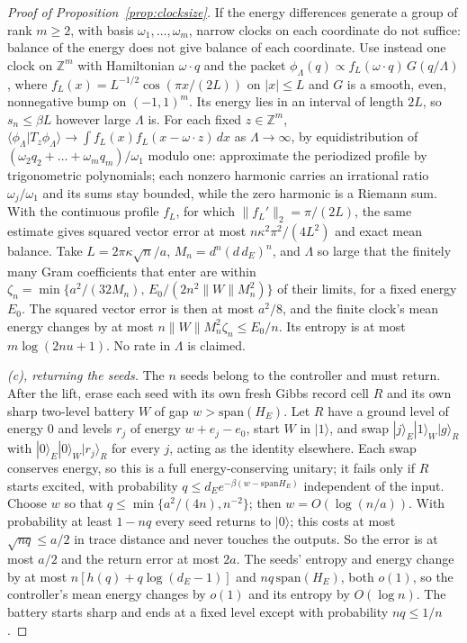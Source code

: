\documentclass[11pt]{article}
\theoremstyle{definition}
\theoremstyle{remark}
\begin{document}
\begin{proof}[Proof of Proposition~\ref{prop:clocksize}]
If the energy differences generate a group of rank $m\ge2$, with basis $\omega_1,\dots,\omega_m$, narrow clocks on each coordinate do not suffice: balance of the energy does not give balance of each coordinate. Use instead one clock on $\mathbb Z^m$ with Hamiltonian $\omega\cdot q$ and the packet $\phi_\Lambda(q)\propto f_L(\omega\cdot q)\,G(q/\Lambda)$, where $f_L(x)=L^{-1/2}\cos(\pi x/(2L))$ on $|x|\le L$ and $G$ is a smooth, even, nonnegative bump on $(-1,1)^m$. Its energy lies in an interval of length $2L$, so $s_n\le\beta L$ however large $\Lambda$ is. For each fixed $z\in\mathbb Z^m$, $\langle\phi_\Lambda|T_z\phi_\Lambda\rangle\to\int f_L(x)f_L(x-\omega\cdot z)\,dx$ as $\Lambda\to\infty$, by equidistribution of $(\omega_2q_2+\dots+\omega_mq_m)/\omega_1$ modulo one: approximate the periodized profile by trigonometric polynomials; each nonzero harmonic carries an irrational ratio $\omega_j/\omega_1$ and its sums stay bounded, while the zero harmonic is a Riemann sum. With the continuous profile $f_L$, for which $\|f_L'\|_2=\pi/(2L)$, the same estimate gives squared vector error at most $n\kappa^2\pi^2/(4L^2)$ and exact mean balance. Take $L=2\pi\kappa\sqrt n/a$, $M_n=d^n(d\,d_E)^n$, and $\Lambda$ so large that the finitely many Gram coefficients that enter are within $\zeta_n=\min\{a^2/(32M_n),\,E_0/(2n^2\|W\|M_n^2)\}$ of their limits, for a fixed energy $E_0$. The squared vector error is then at most $a^2/8$, and the finite clock's mean energy changes by at most $n\|W\|M_n^2\zeta_n\le E_0/n$. Its entropy is at most $m\log(2nu+1)$. No rate in $\Lambda$ is claimed.

\emph{(c), returning the seeds.} The $n$ seeds belong to the controller and must return. After the lift, erase each seed with its own fresh Gibbs record cell $R$ and its own sharp two-level battery $W$ of gap $w>\mathrm{span}(H_E)$. Let $R$ have a ground level of energy $0$ and levels $r_j$ of energy $w+e_j-e_0$, start $W$ in $|1\rangle$, and swap $|j\rangle_E|1\rangle_W|g\rangle_R$ with $|0\rangle_E|0\rangle_W|r_j\rangle_R$ for every $j$, acting as the identity elsewhere. Each swap conserves energy, so this is a full energy-conserving unitary; it fails only if $R$ starts excited, with probability $q\le d_Ee^{-\beta(w-\mathrm{span}H_E)}$ independent of the input. Choose $w$ so that $q\le\min\{a^2/(4n),n^{-2}\}$; then $w=O(\log(n/a))$. With probability at least $1-nq$ every seed returns to $|0\rangle$; this costs at most $\sqrt{nq}\le a/2$ in trace distance and never touches the outputs. So the error is at most $a/2$ and the return error at most $2a$. The seeds' entropy and energy change by at most $n[h(q)+q\log(d_E-1)]$ and $nq\,\mathrm{span}(H_E)$, both $o(1)$, so the controller's mean energy changes by $o(1)$ and its entropy by $O(\log n)$. The battery starts sharp and ends at a fixed level except with probability $nq\le1/n$.


\end{proof}
\end{document}
